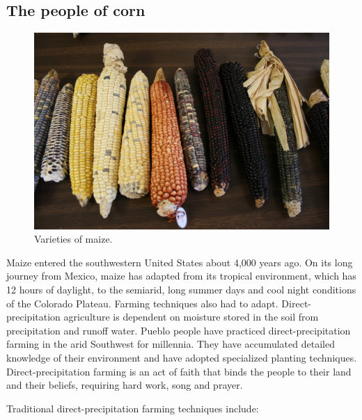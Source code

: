 \documentclass[12pt,]{article}
\begin{document}
\hypertarget{the-people-of-corn}{%
\subsection{The people of corn}\label{the-people-of-corn}}

\begin{figure}
\centering
\includegraphics{./images/varieties.jpg}
\caption{Varieties of maize.}
\end{figure}

Maize entered the southwestern United States about 4,000 years ago. On its long journey from Mexico, maize has adapted from its tropical environment, which has 12 hours of daylight, to the semiarid, long summer days and cool night conditions of the Colorado Plateau. Farming techniques also had to adapt. Direct-precipitation agriculture is dependent on moisture stored in the soil from precipitation and runoff water. Pueblo people have practiced direct-precipitation farming in the arid Southwest for millennia. They have accumulated detailed knowledge of their environment and have adopted specialized planting techniques. Direct-precipitation farming is an act of faith that binds the people to their land and their beliefs, requiring hard work, song and prayer.

Traditional direct-precipitation farming techniques include:
\end{document}

